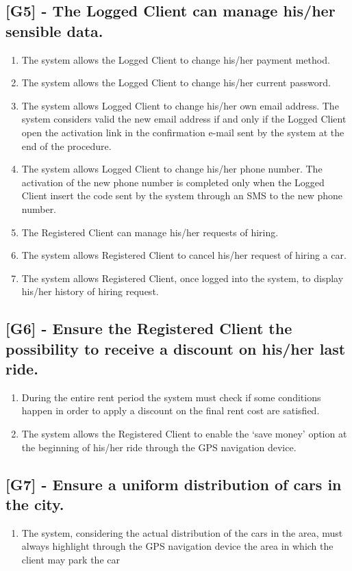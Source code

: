 \subsection{[G5] - The Logged Client can manage his/her sensible data.}
\begin{enumerate}[label=R5.\arabic*]
\item The system allows the Logged Client to change his/her payment method.
\item The system allows the Logged Client to change his/her current password.
\item The system allows Logged Client to change his/her own email address. The system considers valid the new email address if and only if the Logged Client open the activation link in the confirmation e-mail sent by the system at the end of the procedure.
\item The system allows Logged Client to change his/her phone number. The activation of the new phone number is completed only when the Logged Client insert the code sent by the system through an SMS to the new phone number.
\item The Registered Client can manage his/her requests of hiring.
\item The system allows Registered Client to cancel his/her request of hiring a car.
\item The system allows Registered Client, once logged into the system, to display his/her history of hiring request.
\end{enumerate}

\subsection{[G6] - Ensure the Registered Client the possibility to receive a discount on his/her last ride.}
\begin{enumerate}[label=R6.\arabic*]
\item During the entire rent period the system must check if some conditions happen in order to apply a discount on the final rent cost are satisfied.
\item The system allows the Registered Client to enable the ‘save money’ option at the beginning of his/her ride through the GPS navigation device.
\end{enumerate}

\subsection{[G7] - Ensure a uniform distribution of cars in the city.}
\begin{enumerate}[label=R7.\arabic*]
\item The system, considering the actual distribution of the cars in the area, must always highlight through the GPS navigation device the area in which the client may park the car
\end{enumerate}

